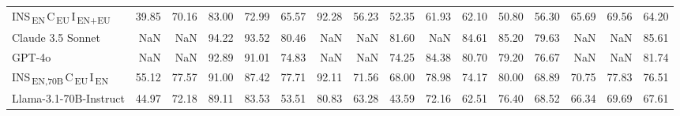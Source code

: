 \begin{tabular}{lrrrrrrrrrrrrrrr}
INS\textsubscript{\,EN}\,C\textsubscript{\,EU}\,I\textsubscript{\,EN+EU} & 39.85 & 70.16 & 83.00 & 72.99 & 65.57 & 92.28 & 56.23 & 52.35 & 61.93 & 62.10 & 50.80 & 56.30 & 65.69 & 69.56 & 64.20 \\
Claude 3.5 Sonnet & NaN & NaN & 94.22 & 93.52 & 80.46 & NaN & NaN & 81.60 & NaN & 84.61 & 85.20 & 79.63 & NaN & NaN & 85.61 \\
GPT-4o & NaN & NaN & 92.89 & 91.01 & 74.83 & NaN & NaN & 74.25 & 84.38 & 80.70 & 79.20 & 76.67 & NaN & NaN & 81.74 \\
INS\textsubscript{\,EN,70B}\,C\textsubscript{\,EU}\,I\textsubscript{\,EN} & 55.12 & 77.57 & 91.00 & 87.42 & 77.71 & 92.11 & 71.56 & 68.00 & 78.98 & 74.17 & 80.00 & 68.89 & 70.75 & 77.83 & 76.51 \\
Llama-3.1-70B-Instruct & 44.97 & 72.18 & 89.11 & 83.53 & 53.51 & 80.83 & 63.28 & 43.59 & 72.16 & 62.51 & 76.40 & 68.52 & 66.34 & 69.69 & 67.61 \\
\bottomrule
\end{tabular}
